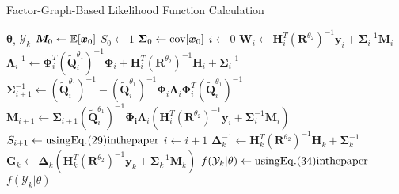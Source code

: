 \begin{algorithm}[]
\caption{Factor-Graph-Based Likelihood Function Calculation}
\begin{algorithmic}[1]
    \label{al:likelihood}
\REQUIRE $\bm{\theta}$, $\mathcal{Y}_k$
\STATE $\bm{ M}_0 \leftarrow \mathbb{E}[\bm{ x}_0]$
\STATE $S_0 \leftarrow 1$
\STATE $\bm { \Sigma}_0 \leftarrow {\rm cov}[\bm{ x}_0]$
\STATE $i \leftarrow 0$
    \STATE $\bm{ W}_i\leftarrow \bm{ H}_i^T(\bm{ R}^{\theta_2})^{-1}\bm{ y}_i + \bm { \Sigma}_i^{-1}\bm{ M}_i$
    \STATE $\bm{ \Lambda}_i^{-1}\leftarrow \bm{ \Phi}_i^T(\bm{ \tilde Q}_i^{\theta_1})^{-1}\bm{ \Phi}_i + \bm{ H}_i^{T}(\bm{ R}^{\theta_2})^{-1}\bm{ H}_i+\bm { \Sigma}_i^{-1}$
    \STATE $\bm { \Sigma}_{i+1}^{-1}\leftarrow (\bm{ \tilde Q}_i^{\theta_1})^{-1} - (\bm{ \tilde Q}_i^{\theta_1})^{-1}\bm{ \Phi}_i\bm{ \Lambda}_i\bm{ \Phi}_i^T(\bm{ \tilde Q}_i^{\theta_1})^{-1}$
    \STATE $\bm{ M}_{i+1}\leftarrow \bm { \Sigma}_{i+1}(\bm{ \tilde Q}_i^{\theta_1})^{-1}\bm{ \Phi_i}\bm{ \Lambda}_i(\bm{ H}_i^T(\bm{ R}^{\theta_2})^{-1}\bm{ y}_i+\bm { \Sigma}_i^{-1}\bm{ M}_i)$
    \STATE $S_{i+1} \leftarrow {\rm using Eq.(29) in the paper}$
    \STATE $i \leftarrow i+1$
\ENDWHILE
\STATE $\bm{ \Delta}_k^{-1}\leftarrow \bm{ H}_k^T(\bm{ R}^{\theta_2})^{-1}\bm{ H}_k + \bm { \Sigma}_k^{-1}$
\STATE $\bm{ G}_k \leftarrow \bm{ \Delta}_k(\bm{ H}_k^T(\bm{ R}^{\theta_2})^{-1}\bm{ y}_k + \bm { \Sigma}_k^{-1}\bm{ M}_k)$
\STATE $f(\mathcal{Y}_k|\theta) \leftarrow {\rm using Eq.(34) in the paper}$
\ENSURE $f(\mathcal{Y}_k|\theta)$
\end{algorithmic}
\end{algorithm}